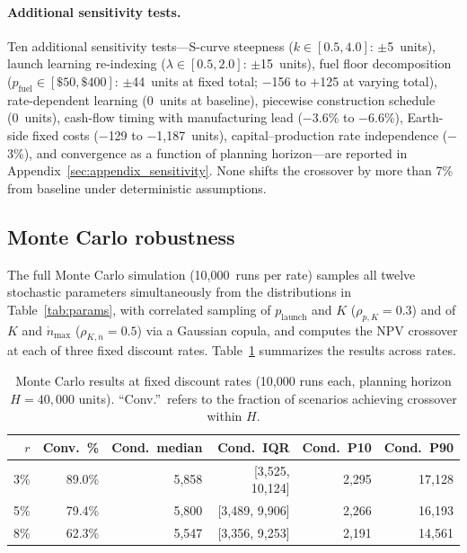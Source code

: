 \documentclass[preprint,12pt]{elsarticle}
\begin{document}
\paragraph{Additional sensitivity tests.} Ten additional sensitivity tests---S-curve steepness ($k \in [0.5, 4.0]$: $\pm$5~units), launch learning re-indexing ($\lambda \in [0.5, 2.0]$: $\pm$15~units), fuel floor decomposition ($p_{\mathrm{fuel}} \in [\$50, \$400]$: $\pm$44~units at fixed total; $-$156 to $+$125 at varying total), rate-dependent learning (0~units at baseline), piecewise construction schedule (0~units), cash-flow timing with manufacturing lead ($-$3.6\% to $-$6.6\%), Earth-side fixed costs ($-$129 to $-$1{,}187~units), capital--production rate independence ($-$3\%), and convergence as a function of planning horizon---are reported in Appendix~\ref{sec:appendix_sensitivity}. None shifts the crossover by more than 7\% from baseline under deterministic assumptions.

\subsection{Monte Carlo robustness}
\label{sec:mc_robustness}

The full Monte Carlo simulation (10{,}000~runs per rate) samples all twelve stochastic parameters simultaneously from the distributions in Table~\ref{tab:params}, with correlated sampling of $p_{\mathrm{launch}}$ and $K$ ($\rho_{p,K} = 0.3$) and of $K$ and $\dot{n}_{\max}$ ($\rho_{K,\dot{n}} = 0.5$) via a Gaussian copula, and computes the NPV crossover at each of three fixed discount rates. Table~\ref{tab:mc_summary} summarizes the results across rates.

\begin{table}[htbp]
\centering
\caption{Monte Carlo results at fixed discount rates (10{,}000 runs each, planning horizon $H = 40{,}000$ units). ``Conv.''\ refers to the fraction of scenarios achieving crossover within $H$.}
\label{tab:mc_summary}
\small
\begin{tabular}{@{}rrrrrr@{}}
\toprule
$r$ & Conv.\ \% & Cond.\ median & Cond.\ IQR & Cond.\ P10 & Cond.\ P90 \\
\midrule
3\%  & 89.0\% & 5{,}858 & [3{,}525, 10{,}124] & 2{,}295 & 17{,}128 \\
5\%  & 79.4\% & 5{,}800 & [3{,}489, 9{,}906]  & 2{,}266 & 16{,}193 \\
8\%  & 62.3\% & 5{,}547 & [3{,}356, 9{,}253]  & 2{,}191 & 14{,}561 \\
\bottomrule
\end{tabular}
\end{table}
\end{document}
